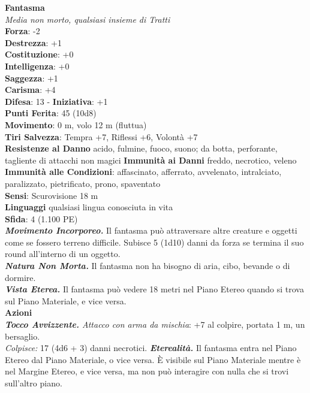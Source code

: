 \begin{multicols}{2}
\medskip\textbf{Fantasma}\\
\emph{Media non morto, qualsiasi insieme di Tratti}\\
\textbf{Forza}: -2\\
\textbf{Destrezza}: +1\\
\textbf{Costituzione}: +0\\
\textbf{Intelligenza}: +0\\
\textbf{Saggezza}: +1\\
\textbf{Carisma}: +4\\
\textbf{Difesa}: 13 - \textbf{Iniziativa}: +1\\
\textbf{Punti Ferita}: 45 (10d8)\\
\textbf{Movimento}: 0 m, volo 12 m (fluttua)\\
\textbf{Tiri Salvezza}: Tempra +7, Riflessi +6, Volontà +7\\
\textbf{Resistenze al Danno} acido, fulmine, fuoco, suono; da botta, perforante, tagliente di attacchi non magici
\textbf{Immunità ai Danni} freddo, necrotico, veleno\\
\textbf{Immunità alle Condizioni}: affascinato, afferrato, avvelenato, intralciato, paralizzato, pietrificato, prono, spaventato \\
\textbf{Sensi}: Scurovisione 18 m\\
\textbf{Linguaggi} qualsiasi lingua conosciuta in vita\\
\textbf{Sfida}: 4 (1.100 PE)\smallskip\\
\emph{\textbf{Movimento Incorporeo.}} Il fantasma può attraversare altre creature e oggetti come se fossero terreno difficile. Subisce 5 (1d10) danni da forza se termina il suo round all'interno di un oggetto.\\
\emph{\textbf{Natura Non Morta.}} Il fantasma non ha bisogno di aria, cibo, bevande o di dormire.\\
\emph{\textbf{Vista Eterea.}} Il fantasma può vedere 18 metri nel Piano  Etereo quando si trova sul Piano Materiale, e vice versa.\\
\smallskip\textbf{Azioni}\\
\emph{\textbf{Tocco Avvizzente.} Attacco con arma da mischia}: +7 al colpire, portata 1 m, un bersaglio.\\
\emph{Colpisce:} 17 (4d6 + 3) danni necrotici. 
\emph{\textbf{Eterealità.}} Il fantasma entra nel Piano Etereo dal Piano Materiale, o vice versa. È visibile sul Piano Materiale mentre è nel Margine Etereo, e vice versa, ma non può interagire con nulla che si trovi sull'altro piano.\\

\end{multicols}
